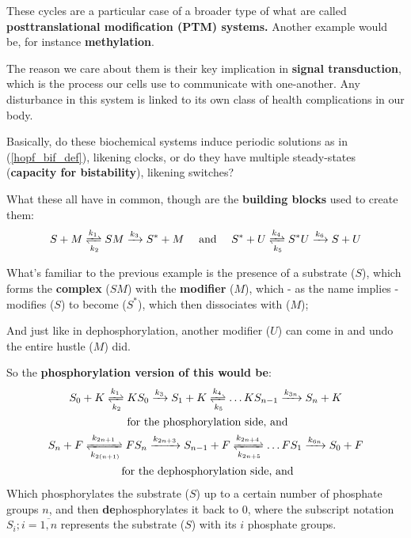 \hfill\break
These cycles are a particular case of a broader type of what are called \textbf{posttranslational modification (PTM) systems.} Another example would be, for instance \textbf{methylation}.

The reason we care about them is their key implication in \textbf{ signal transduction}, which is the process our cells use to communicate with one-another. Any disturbance in this system is linked to its own class of health complications in our body.

Basically, do these biochemical systems induce periodic solutions as in (\ref{hopf_bif_def}), likening clocks, or do they have multiple steady-states (\textbf{capacity for bistability}), likening switches?

What these all have in common, though are the \textbf{building blocks} used to create them:
\begin{equation}\label{ptm_building_blocks}
	S+M \xrightleftharpoons[k_2]{k_1} SM \xrightarrow{k_3} S^* + M \quad \mathrm{~and~} \quad S^* + U \xrightleftharpoons[k_5]{k_4} S^* U \xrightarrow{k_6} S + U
\end{equation}

What's familiar to the previous example is the presence of a substrate ($S$), which forms the \textbf{complex} ($SM$) with the \textbf{modifier} ($M$), which - as the name implies - modifies ($S$) to become ($S^*$), which then dissociates with ($M$);

And just like in dephosphorylation, another modifier ($U$) can come in and undo the entire hustle ($M$) did.

So the \textbf{phosphorylation version of this would be}:
\begin{gather*}\label{phosphorylation_reaction_basis}
	S_0 + K \xrightleftharpoons[k_2]{k_1} K S_0 \xrightarrow{k_3} S_1 + K  \xrightleftharpoons[k_5]{k_4} \ldots K S_{n-1} \xrightarrow{k_{ 3n}} S_n + K  \\
	\text{ for the phosphorylation side, and} \\
	S_n + F \xrightleftharpoons[k_{2(n+1)}]{k_{2n+1}} F S_n \xrightarrow{k_{2n + 3}} S_{n-1} + F  \xrightleftharpoons[k_{2n + 5}]{k_{2n + 4}} \ldots F S_{1} \xrightarrow{k_{6n}} S_0 + F  \\
	\text{ for the dephosphorylation side, and}
\end{gather*}
Which phosphorylates the substrate ($S$) up to a certain number of phosphate groups $n$, and then \textbf{de}phosphorylates it back to 0, where the subscript notation $S_i ;  i = \overline{1,n}$ represents the substrate ($S$) with its $i$ phosphate groups.

